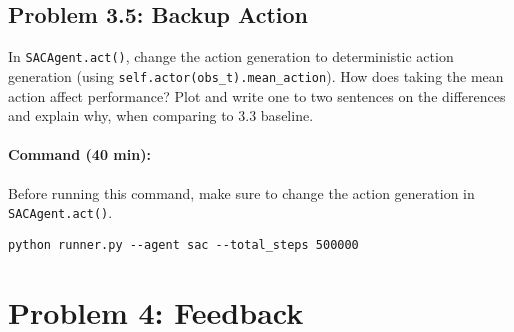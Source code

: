\documentclass[12pt]{article}
\begin{document}
\begin{solution}[height=5cm]
\end{solution}

\subsection*{Problem 3.5: Backup Action}

In \texttt{SACAgent.act()}, change the action generation to deterministic action generation (using \texttt{self.actor(obs_t).mean\_action}). How does taking the mean action affect performance? Plot and write one to two sentences on the differences and explain why, when comparing to 3.3 baseline.

\paragraph{Command (40 min):} Before running this command, make sure to change the action generation in  \texttt{SACAgent.act()}.
\begin{verbatim}
python runner.py --agent sac --total_steps 500000
\end{verbatim}

\begin{solution}[height=5cm]
\end{solution}




\newpage

\section*{Problem 4: Feedback}
\end{document}
